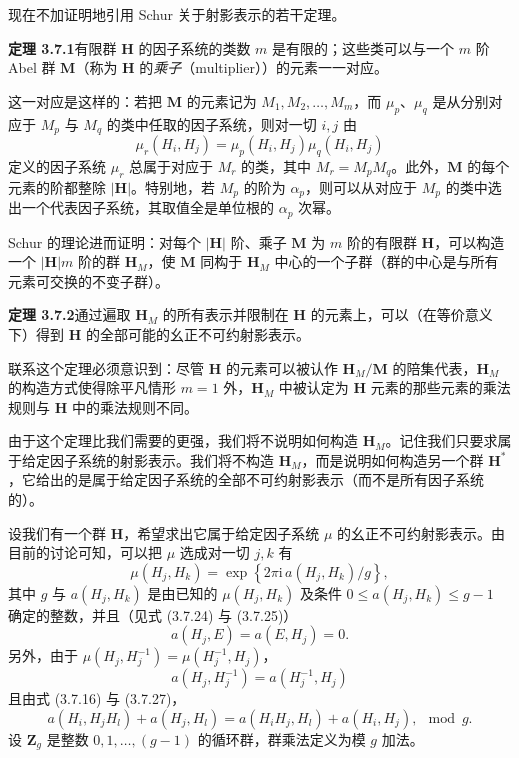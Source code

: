 现在不加证明地引用 Schur 关于射影表示的若干定理。

\noindent\textbf{定理 3.7.1}\quad 有限群 $\mathbf{H}$ 的因子系统的类数 $m$ 是有限的；这些类可以与一个 $m$ 阶 Abel 群 $\mathbf{M}$（称为 $\mathbf{H}$ 的\textit{乘子}（multiplier））的元素一一对应。

这一对应是这样的：若把 $\mathbf{M}$ 的元素记为 $M_{1}, M_{2}, \dots, M_{m}$，而 $\mu_{p}$、$\mu_{q}$ 是从分别对应于 $M_{p}$ 与 $M_{q}$ 的类中任取的因子系统，则对一切 $i, j$ 由
\begin{equation*}
\mu_{r}(H_{i}, H_{j}) = \mu_{p}(H_{i}, H_{j})\mu_{q}(H_{i}, H_{j})
\tag{3.7.26}
\end{equation*}
定义的因子系统 $\mu_{r}$ 总属于对应于 $M_{r}$ 的类，其中 $M_{r} = M_{p}M_{q}$。此外，$\mathbf{M}$ 的每个元素的阶都整除 $|\mathbf{H}|$。特别地，若 $M_{p}$ 的阶为 $\alpha_{p}$，则可以从对应于 $M_{p}$ 的类中选出一个代表因子系统，其取值全是单位根的 $\alpha_{p}$ 次幂。

Schur 的理论进而证明：对每个 $|\mathbf{H}|$ 阶、乘子 $\mathbf{M}$ 为 $m$ 阶的有限群 $\mathbf{H}$，可以构造一个 $|\mathbf{H}|m$ 阶的群 $\mathbf{H}_{M}$，使 $\mathbf{M}$ 同构于 $\mathbf{H}_{M}$ 中心的一个子群（群的中心是与所有元素可交换的不变子群）。

\noindent\textbf{定理 3.7.2}\quad 通过遍取 $\mathbf{H}_{M}$ 的所有表示并限制在 $\mathbf{H}$ 的元素上，可以（在等价意义下）得到 $\mathbf{H}$ 的全部可能的幺正不可约射影表示。

联系这个定理必须意识到：尽管 $\mathbf{H}$ 的元素可以被认作 $\mathbf{H}_{M}/\mathbf{M}$ 的陪集代表，$\mathbf{H}_{M}$ 的构造方式使得除平凡情形 $m = 1$ 外，$\mathbf{H}_{M}$ 中被认定为 $\mathbf{H}$ 元素的那些元素的乘法规则与 $\mathbf{H}$ 中的乘法规则不同。

由于这个定理比我们需要的更强，我们将不说明如何构造 $\mathbf{H}_{M}$。记住我们只要求属于给定因子系统的射影表示。我们将不构造 $\mathbf{H}_{M}$，而是说明如何构造另一个群 $\mathbf{H}^{*}$，它给出的是属于给定因子系统的全部不可约射影表示（而不是所有因子系统的）。

设我们有一个群 $\mathbf{H}$，希望求出它属于给定因子系统 $\mu$ 的幺正不可约射影表示。由目前的讨论可知，可以把 $\mu$ 选成对一切 $j, k$ 有
\begin{equation*}
\mu(H_{j}, H_{k}) = \exp\left\{2\pi\mathrm{i}\,a(H_{j}, H_{k})/g\right\},
\tag{3.7.27}
\end{equation*}
其中 $g$ 与 $a(H_{j}, H_{k})$ 是由已知的 $\mu(H_{j}, H_{k})$ 及条件 $0 \leqslant a(H_{j}, H_{k}) \leqslant g-1$ 确定的整数，并且（见式 (3.7.24) 与 (3.7.25)）
\begin{equation*}
a(H_{j}, E) = a(E, H_{j}) = 0.
\tag{3.7.28}
\end{equation*}
另外，由于 $\mu(H_{j}, H^{-1}_{j}) = \mu(H^{-1}_{j}, H_{j})$，
\begin{equation*}
a(H_{j}, H^{-1}_{j}) = a(H^{-1}_{j}, H_{j})
\tag{3.7.29}
\end{equation*}
且由式 (3.7.16) 与 (3.7.27)，
\begin{equation*}
a(H_{i}, H_{j}H_{l}) + a(H_{j}, H_{l}) = a(H_{i}H_{j}, H_{l}) + a(H_{i}, H_{j}), \mod g.
\tag{3.7.30}
\end{equation*}
设 $\mathbf{Z}_{g}$ 是整数 $0, 1, \dots, (g-1)$ 的循环群，群乘法定义为模 $g$ 加法。

